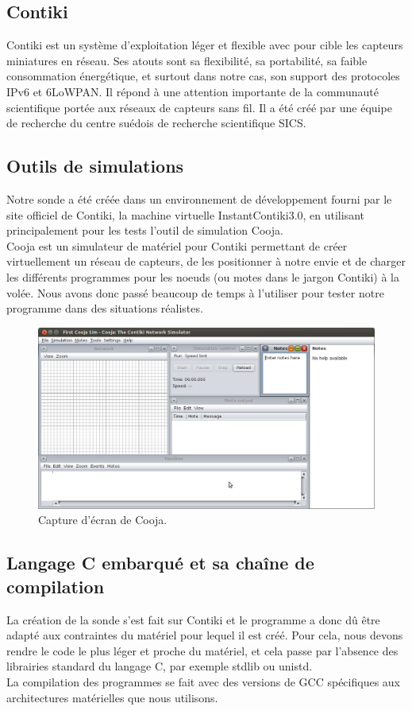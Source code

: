 	\subsection{Contiki}
	Contiki est un système d'exploitation léger et flexible avec pour cible les capteurs miniatures en réseau. Ses atouts sont sa flexibilité, sa portabilité, sa faible consommation énergétique, et surtout dans notre cas, son support des protocoles IPv6 et 6LoWPAN. Il répond à une attention importante de la communauté scientifique portée aux réseaux de capteurs sans fil. Il a été créé par une équipe de recherche du centre suédois de recherche scientifique SICS.
	
	\subsection{Outils de simulations}
	Notre sonde a été créée dans un environnement de développement fourni par le site officiel de Contiki, la machine virtuelle InstantContiki3.0, en utilisant principalement pour les tests l'outil de simulation Cooja.\\
	Cooja est un simulateur de matériel pour Contiki permettant de créer virtuellement un réseau de capteurs, de les positionner à notre envie et de charger les différents programmes pour les noeuds (ou motes dans le jargon Contiki) à la volée.
	Nous avons donc passé beaucoup de temps à l'utiliser pour tester notre programme dans des situations réalistes.
	\clearpage
	\begin{figure}[htp]
		\centering
		\includegraphics[width=16cm]{images/cooja}
		\caption{Capture d'écran de Cooja.}
		\label{fig:Cooja}
	\end{figure}

	\subsection{Langage C embarqué et sa chaîne de compilation}
	La création de la sonde s'est fait sur Contiki et le programme a donc dû être adapté aux contraintes du matériel pour lequel il est créé. Pour cela, nous devons rendre le code le plus léger et proche du matériel, et cela passe par l'absence des librairies standard du langage C, par exemple stdlib ou unistd.\\
	La compilation des programmes se fait avec des versions de GCC spécifiques aux architectures matérielles que nous utilisons.
	
